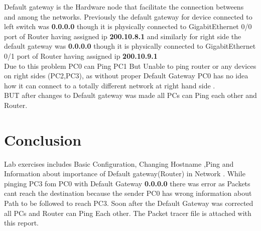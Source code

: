 \documentclass[12pt]{article}
\begin{document}
Default gateway is the Hardware node that facilitate the connection betweens and among the networks. Previously  the default gateway for device connected to left switch was \textbf{0.0.0.0} though it is physically connected to GigabitEthernet 0/0 port of Router having assigned ip \textbf{200.10.8.1} and similarly for right side the default gateway was \textbf{0.0.0.0} though it is physically connected to GigabitEthernet 0/1 port of Router having assigned ip \textbf{200.10.9.1}\\

Due to this  problem PC0 can Ping PC1 But Unable to ping router or any devices on right sides (PC2,PC3), as without proper Default Gateway PC0 has  no idea how it can connect to a totally different network at right hand side .\\

BUT after changes to Default gateway was made  all PCs can Ping each other and  Router.


\section{Conclusion}
Lab exercises includes Basic Configuration, Changing Hostname ,Ping and Information about importance of Default gateway(Router) in Network . While pinging PC3 fom PC0 with Default Gateway \textbf{0.0.0.0} there was error as Packets cant reach the destination because the sender PC0 has wrong information about Path to be followed to reach PC3. Soon after the Default Gateway was corrected all PCs and Router can Ping Each other. The Packet tracer file is attached with this report.
\end{document}
